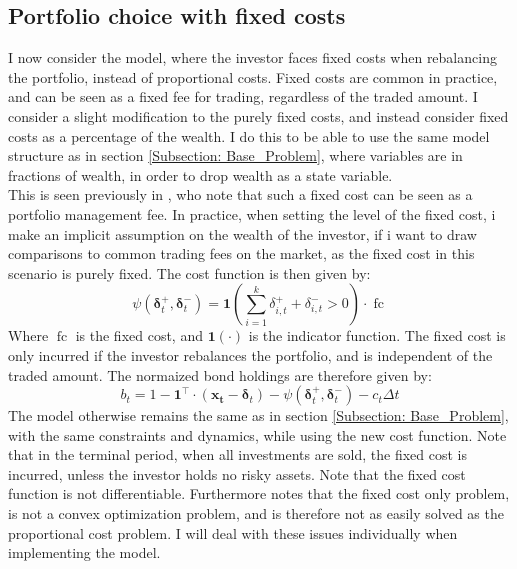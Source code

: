 \documentclass[11pt]{article}
\begin{document}
\subsection{Portfolio choice with fixed costs}
I now consider the model, where the investor faces fixed costs when rebalancing the portfolio, instead of proportional costs.
Fixed costs are common in practice, and can be seen as a fixed fee for trading, regardless of the traded amount.
I consider a slight modification to the purely fixed costs, and instead consider fixed costs as a percentage of the wealth.
I do this to be able to use the same model structure as in section \ref{Subsection: Base_Problem}, where variables are in fractions of wealth,
in order to drop wealth as a state variable.\\
This is seen previously in \autocite{morton1995optimal}, who note that such a fixed cost can be seen as a portfolio management fee.
In practice, when setting the level of the fixed cost, i make an implicit assumption on the wealth of the investor,
if i want to draw comparisons to common trading fees on the market, as the fixed cost in this scenario is purely fixed.
The cost function is then given by:
\begin{equation}
  \label{eq:Fixed_Cost_Function}
  \psi (\boldsymbol{\delta}^{+}_{t}, \boldsymbol{\delta}^{-}_{t} ) = \mathbf{1} \left(  \sum^{k}_{i=1} \delta^{+}_{i,t} + \delta^{-}_{i,t}  > 0 \right) \cdot \operatorname{fc}
\end{equation}
Where $\operatorname{fc}$ is the fixed cost, and $\mathbf{1}(\cdot)$ is the indicator function.
The fixed cost is only incurred if the investor rebalances the portfolio, and is independent of the traded amount.
The normaized bond holdings are therefore given by:
\begin{equation}\label{eq: fx_bond_holdings}
  b_{t} = 1 - \mathbf{1}^{\top} \cdot (\mathbf{x_t} - \boldsymbol{\delta}_t) - \psi( \boldsymbol{\delta}^{+}_{t}, \boldsymbol{\delta}^{-}_{t} ) - c_t \Delta t
\end{equation}
The model otherwise remains the same as in section \ref{Subsection: Base_Problem}, with the same constraints and dynamics, while using the new cost function.
Note that in the terminal period, when all investments are sold, the fixed cost is incurred, unless the investor holds no risky assets.
Note that the fixed cost function is not differentiable. Furthermore \autocite{Dybvig2020} notes that the fixed cost only problem,
is not a convex optimization problem, and is therefore not as easily solved as the proportional cost problem. I will deal with these issues individually
when implementing the model.
\end{document}
